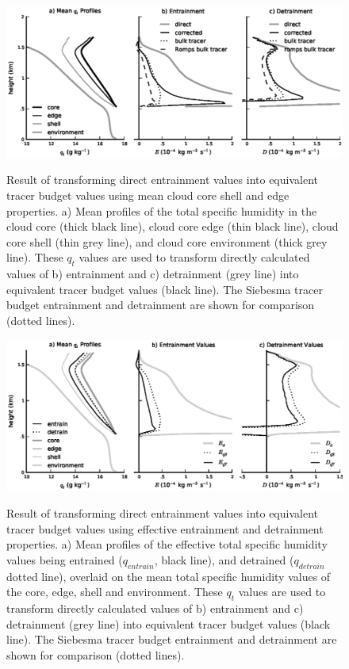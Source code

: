 \documentclass[12pt]{article}
\begin{document}
\begin{figure}[t]
  \noindent\includegraphics[width=39pc,angle=0]{./figures/shell_correction}\\
  \caption{Result of transforming direct entrainment values into equivalent 
  tracer budget values using mean cloud core shell and edge properties.  
  a) Mean profiles of the total specific humidity in the cloud core (thick 
  black line), cloud core edge (thin black line), cloud core shell (thin 
  grey line), and cloud core environment (thick grey line).  These $q_t$ 
  values are used to transform directly calculated values of b) entrainment 
  and c) detrainment (grey line) into equivalent tracer budget values 
  (black line).  The Siebesma tracer budget entrainment and detrainment
  are shown for comparison (dotted lines).}
  \label{fig:Shell_correction}
\end{figure}

\begin{figure}[t]
  \noindent\includegraphics[width=39pc,angle=0]{./figures/reynolds_correction}\\
  \caption{Result of transforming direct entrainment values into equivalent 
  tracer budget values using effective entrainment and detrainment properties.
  a) Mean profiles of the effective total specific humidity values being
  entrained ($q_{entrain}$, black line), and detrained ($q_{detrain}$ dotted
  line), overlaid on the mean total specific humidity values of the core, edge, 
  shell and environment.  These $q_t$ values are used to transform directly 
  calculated values of b) entrainment and c) detrainment (grey line) into 
  equivalent tracer budget values (black line).  The Siebesma tracer 
  budget entrainment and detrainment are shown for comparison (dotted lines).}
  \label{fig:Reynolds_correction}
\end{figure}
\end{document}
